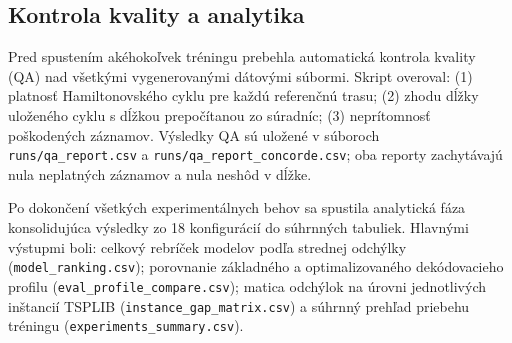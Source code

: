 \subsection{Kontrola kvality a analytika}
\label{sec:qa_analytika}

\indent Pred spustením akéhokoľvek tréningu prebehla automatická
kontrola kvality (QA) nad všetkými vygenerovanými dátovými súbormi.
Skript overoval: (1) platnosť Hamiltonovského cyklu pre každú
referenčnú trasu; (2) zhodu dĺžky uloženého cyklu s dĺžkou
prepočítanou zo súradníc; (3) neprítomnosť poškodených záznamov.
Výsledky QA sú uložené v súboroch \texttt{runs/qa\_report.csv}
a \texttt{runs/qa\_report\_concorde.csv}; oba reporty zachytávajú
nula neplatných záznamov a nula neshôd v dĺžke.

\indent Po dokončení všetkých experimentálnych behov sa spustila
analytická fáza konsolidujúca výsledky zo 18 konfigurácií do súhrnných
tabuliek. Hlavnými výstupmi boli: celkový rebríček modelov podľa
strednej odchýlky (\texttt{model\_ranking.csv}); porovnanie základného
a optimalizovaného dekódovacieho profilu
(\texttt{eval\_profile\_compare.csv}); matica odchýlok na úrovni
jednotlivých inštancií TSPLIB (\texttt{instance\_gap\_matrix.csv})
a súhrnný prehľad priebehu tréningu (\texttt{experiments\_summary.csv}).